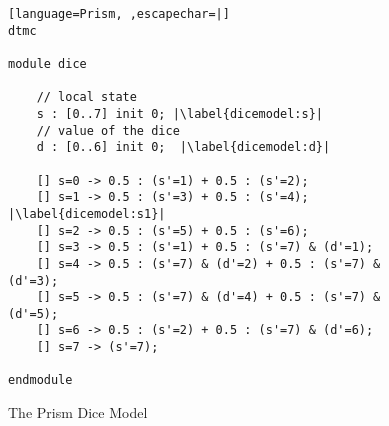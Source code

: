 \documentclass[
a4paper,
12pt
]{scrartcl}
\begin{document}
\begin{figure}[ht!]
\begin{lstlisting}[language=Prism, ,escapechar=|]
dtmc

module dice

	// local state
	s : [0..7] init 0; |\label{dicemodel:s}|
	// value of the dice
	d : [0..6] init 0;  |\label{dicemodel:d}|
	
	[] s=0 -> 0.5 : (s'=1) + 0.5 : (s'=2);
	[] s=1 -> 0.5 : (s'=3) + 0.5 : (s'=4); |\label{dicemodel:s1}|
	[] s=2 -> 0.5 : (s'=5) + 0.5 : (s'=6);
	[] s=3 -> 0.5 : (s'=1) + 0.5 : (s'=7) & (d'=1);
	[] s=4 -> 0.5 : (s'=7) & (d'=2) + 0.5 : (s'=7) & (d'=3);
	[] s=5 -> 0.5 : (s'=7) & (d'=4) + 0.5 : (s'=7) & (d'=5);
	[] s=6 -> 0.5 : (s'=2) + 0.5 : (s'=7) & (d'=6);
	[] s=7 -> (s'=7);
	
endmodule

\end{lstlisting}
\caption{The Prism Dice Model}
\label{fig:dicemodel}
\end{figure}
\end{document}
